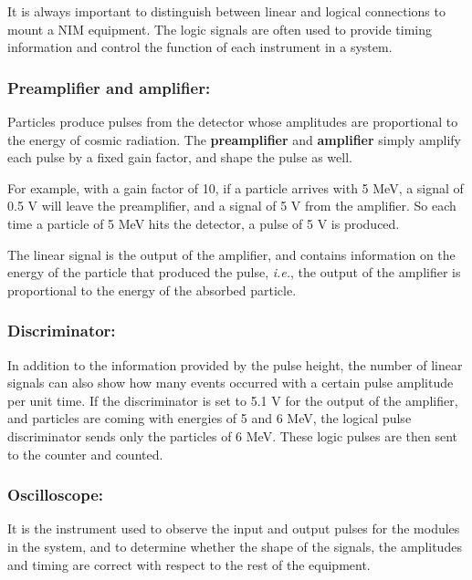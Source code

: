 It is always important to distinguish between linear and logical connections to mount a NIM equipment. The logic signals are often used to provide timing information and control the function of each instrument in a system.

		\subsubsection{Preamplifier and amplifier:}

Particles produce pulses from the detector whose amplitudes are proportional to the energy of cosmic radiation. The \textbf{preamplifier} and \textbf{amplifier} simply amplify each pulse by a fixed gain factor, and shape the pulse as well.

For example, with a gain factor of 10, if a particle arrives with 5 MeV, a signal of 0.5 V will leave the preamplifier, and a signal of 5 V from the amplifier. So each time a particle of 5 MeV hits the detector, a pulse of 5 V is produced.

The linear signal is the output of the amplifier, and contains information on the energy of the particle that produced the pulse, \textit{i.e.}, the output of the amplifier is proportional to the energy of the absorbed particle. 

		\subsubsection{Discriminator:}


In addition to the information provided by the pulse height, the number of linear signals can also show how many events occurred with a certain pulse amplitude per unit time. If the discriminator is set to 5.1 V for the output of the amplifier, and particles are coming with energies of 5 and 6 MeV, the logical pulse discriminator sends only the particles of 6 MeV. These logic pulses are then sent to the counter and counted.

		\subsubsection{Oscilloscope:}

It is the instrument used to observe the input and output pulses for the modules in the system, and to determine whether the shape of the signals, the amplitudes and timing are correct with respect to the rest of the equipment.

